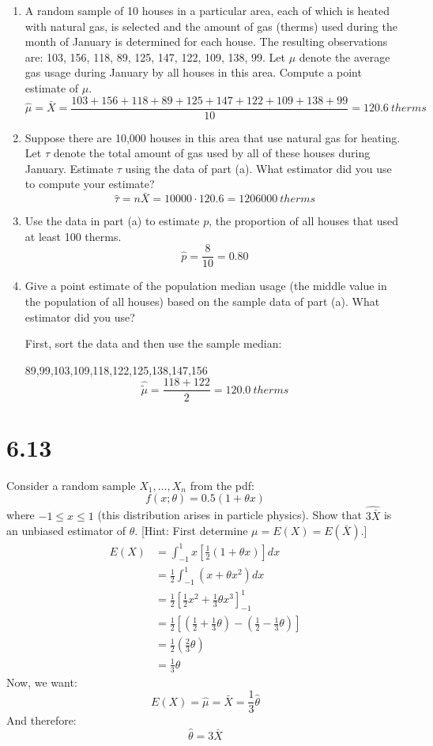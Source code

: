 \documentclass[letterpaper,12pt,fleqn]{article}
\newcommand{\xb}{\bar{X}}
\newcommand{\m}{\mu}
\renewcommand{\O}{\theta}
\renewcommand{\t}{\tau}
\begin{document}
\begin{enumerate}[label={\alph*)}]
\item A random sample of 10 houses in a particular area, each of which is heated with natural gas, is selected and the
  amount of gas (therms) used during the month of January is determined for each house.  The resulting observations are:
  103, 156, 118, 89, 125, 147, 122, 109, 138, 99.  Let \(\m\) denote the average gas usage during January by all houses
  in this area.  Compute a point estimate of \(\m\).
  \[\hat{\m}=\xb=\frac{103+156+118+89+125+147+122+109+138+99}{10}=\SI{120.6}{therms}\]
\item Suppose there are 10,000 houses in this area that use natural gas for heating.  Let \(\t\) denote the total amount of
  gas used by all of these houses during January.  Estimate \(\t\) using the data of part (a).  What estimator did you use
  to compute your estimate?
  \[\hat{\t}=n\xb=10000\cdot120.6=\SI{1206000}{therms}\]
\item Use the data in part (a) to estimate \(p\), the proportion of all houses that used at least 100 therms.
  \[\hat{p}=\frac{8}{10}=0.80\]
\item Give a point estimate of the population median usage (the middle value in the population of all houses) based on the
  sample data of part (a).  What estimator did you use?

  First, sort the data and then use the sample median:

  89,99,103,109,118,122,125,138,147,156
  \[\hat{\tilde{\m}}=\frac{118+122}{2}=\SI{120.0}{therms}\]
\end{enumerate}

\section*{6.13}

Consider a random sample \(X_1,\ldots,X_n\) from the pdf:
\[f(x;\O)=0.5(1+\O x)\]
where \(-1\le x\le1\) (this distribution arises in particle physics).  Show that \(\hat{3\xb}\) is an unbiased estimator
of \(\O\). [Hint: First determine \(\m=E(X)=E(\xb)\).]
\begin{align*}
  E(X) &= \int_{-1}^1x\left[\frac{1}{2}(1+\O x)\right]dx \\
  &= \frac{1}{2}\int_{-1}^1(x+\O x^2)dx \\
  &= \frac{1}{2}\left[\frac{1}{2}x^2+\frac{1}{3}\O x^3\right]_{-1}^1 \\
  &= \frac{1}{2}\left[\left(\frac{1}{2}+\frac{1}{3}\O\right)-\left(\frac{1}{2}-\frac{1}{3}\O\right)\right] \\
  &= \frac{1}{2}\left(\frac{2}{3}\O\right) \\
  &= \frac{1}{3}\O
\end{align*}
Now, we want:
\[E(X)=\hat{\m}=\xb=\frac{1}{3}\hat{\O}\]
And therefore:
\[\hat{\O}=3\xb\]
\end{document}
